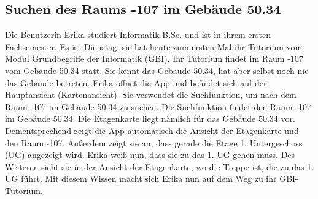 \subsection{Suchen des Raums -107 im Gebäude 50.34}

Die Benutzerin Erika studiert Informatik B.Sc. und ist in ihrem ersten Fachsemester.
Es ist Dienstag, sie hat heute zum ersten Mal ihr Tutorium vom Modul Grundbegriffe der Informatik (GBI).
Ihr Tutorium findet im Raum -107 vom Gebäude 50.34 statt.
Sie kennt das Gebäude 50.34, hat aber selbst noch nie das Gebäude betreten.
Erika öffnet die App und befindet sich auf der Hauptansicht (Kartenansicht).
Sie verwendet die Suchfunktion, um nach dem Raum -107 im Gebäude 50.34 zu suchen.
Die Suchfunktion findet den Raum -107 im Gebäude 50.34.
Die Etagenkarte liegt nämlich für das Gebäude 50.34 vor.
Dementsprechend zeigt die App automatisch die Ansicht der Etagenkarte und den Raum -107.
Außerdem zeigt sie an, dass gerade die Etage 1. Untergeschoss (UG) angezeigt wird.
Erika weiß nun, dass sie zu das 1. UG gehen muss.
Des Weiteren sieht sie in der Ansicht der Etagenkarte, wo die Treppe ist, die zu das 1. UG führt.
Mit diesem Wissen macht sich Erika nun auf dem Weg zu ihr GBI-Tutorium.